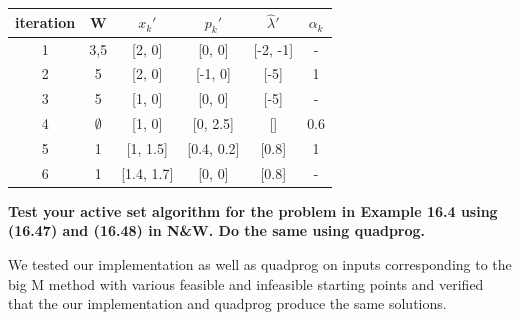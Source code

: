\begin{center}
     \label{table:3_2} 
    \begin{tabular}{c c c c c c } 
    iteration & W & $x_{k}'$ & $p_k'$ & $\hat{\lambda}'$ & $\alpha_k$ \\ 
    \hline
    1 & 3,5 & [2, 0] & [0, 0] & [-2, -1] & -\\ 
    2 & 5 & [2, 0] & [-1, 0] & [-5] & 1\\ 
    3 & 5 & [1, 0] & [0, 0] & [-5] & -\\
    4 & $\emptyset$ & [1, 0] & [0, 2.5] & [] & 0.6\\
    5 & 1 & [1, 1.5] & [0.4, 0.2] & [0.8] & 1\\
    6 & 1 & [1.4, 1.7] & [0, 0] & [0.8] & -\\
    \end{tabular}
\end{center}



\textbf{Test your active set algorithm for the problem in Example 16.4 using (16.47) and (16.48) in N\&W. Do the same using quadprog.}

We tested our implementation as well as quadprog on inputs corresponding to the big M method with various feasible and infeasible starting points and verified that the our implementation and quadprog produce the same solutions.

